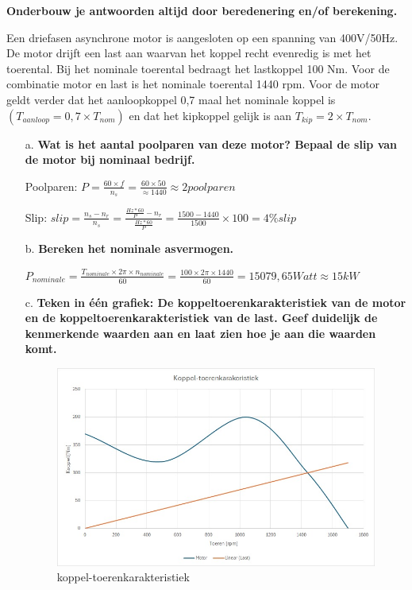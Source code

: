 \textbf{Onderbouw je antwoorden altijd door beredenering en/of berekening.}

Een driefasen asynchrone motor is aangesloten op een spanning van 400V/50Hz.
De motor drijft een last aan waarvan het koppel recht evenredig is met het toerental.
Bij het nominale toerental bedraagt het lastkoppel 100 Nm.
Voor de combinatie motor en last is het nominale toerental 1440 rpm.
Voor de motor geldt verder dat het aanloopkoppel 0,7 maal het nominale koppel is
$(T_{aanloop} = 0,7 \times T_{nom})$ en dat het kipkoppel gelijk is aan $T_{kip} = 2 \times T_{nom}$.

\begin{enumerate}
    \item [a.] \textbf{Wat is het aantal poolparen van deze motor? Bepaal de slip van de motor bij nominaal bedrijf.}
    
        Poolparen:
        $ P = \frac{60 \times f}{n_{s}} = \frac{60 \times 50}{\approx1440} \approx 2 poolparen $

        Slip:
        $slip 
        = \frac{n_{s} - n_{r}}{n_{s}} 
        = \frac{\frac{Hz*60}{P} - n_{r}}{\frac{Hz*60}{P}}
        = \frac{1500 - 1440}{1500} \times 100 
        = 4\% slip$

    \item [b.] \textbf{Bereken het nominale asvermogen.}

    $P_{nominale} 
    = \frac{T_{nominale} \times 2\pi \times n_{nominale}}{60}= \frac{100 \times 2\pi \times 1440}{60} 
    = 15079,65 Watt \approx 15 kW$


    \item [c.] \textbf{Teken in één grafiek: De koppeltoerenkarakteristiek van de motor en de koppeltoerenkarakteristiek van de last. Geef duidelijk de kenmerkende waarden aan en laat zien hoe je aan die waarden komt.}

        \begin{figure}[h]
            \centering
            \includegraphics[scale=0.5]{kopppel-toerenkarakteristiek.jpg}
            \caption{koppel-toerenkarakteristiek}
        \end{figure}


\end{enumerate}
